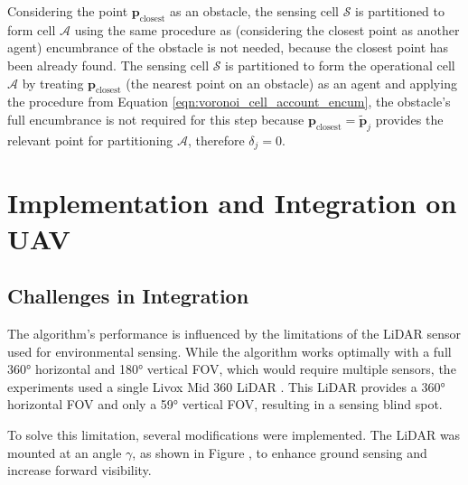             Considering the point $\mathbf{p}_{\text{closest}}$ as an obstacle, the sensing cell $\mathcal{S}$ is partitioned to form cell $\mathcal{A}$ using the same procedure as  (considering the closest point as another agent) encumbrance of the obstacle is not needed, because the closest point has been already found.
            The sensing cell $\mathcal{S}$ is partitioned to form the operational cell $\mathcal{A}$ by treating $\mathbf{p}_{\text{closest}}$ (the nearest point on an obstacle) as an agent and applying the procedure from Equation \eqref{eqn:voronoi_cell_account_encum}, the obstacle's full encumbrance is not required for this step because $\mathbf{p}_{\text{closest}} = \tilde{\mathbf{p}}_{j}$ provides the relevant point for partitioning $\mathcal{A}$, therefore $\delta_j = 0$.

            

    \section{Implementation and Integration on UAV}
    \label{sec:implementation_integration}
        \subsection{Challenges in Integration}
            The algorithm's performance is influenced by the limitations of the \ac{LiDAR} sensor used for environmental sensing. 
            While the algorithm works optimally with a full 360° horizontal and 180° vertical \ac{FOV}, which would require multiple sensors, the experiments used a single Livox Mid 360 \ac{LiDAR} \cite{livox_mid360}. 
            This \ac{LiDAR} provides a 360° horizontal \ac{FOV} and only a 59° vertical \ac{FOV}, resulting in a sensing blind spot.

            To solve this limitation, several modifications were implemented. 
            The \ac{LiDAR} was mounted at an angle $\gamma$, as shown in Figure , to enhance ground sensing and increase forward visibility.

